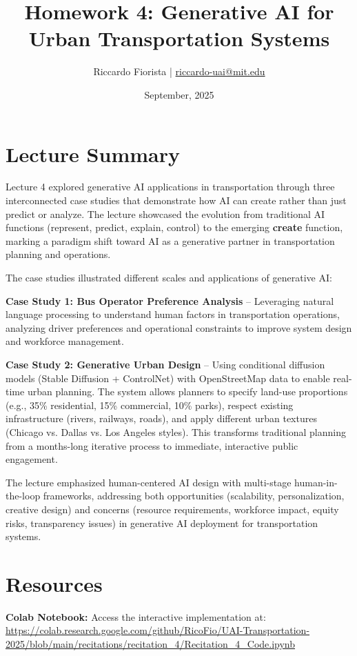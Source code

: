 \documentclass[11pt]{article}
\title{Homework 4: Generative AI for Urban Transportation Systems}
\author{Riccardo Fiorista | \href{mailto:riccardo-uai@mit.edu}{riccardo-uai@mit.edu}}
\date{September, 2025}
\begin{document}
\maketitle
\thispagestyle{fancy} %

\section*{Lecture Summary}

Lecture 4 explored generative AI applications in transportation through three interconnected case studies that demonstrate how AI can create rather than just predict or analyze. The lecture showcased the evolution from traditional AI functions (represent, predict, explain, control) to the emerging \textbf{create} function, marking a paradigm shift toward AI as a generative partner in transportation planning and operations.

The case studies illustrated different scales and applications of generative AI:

\textbf{Case Study 1: Bus Operator Preference Analysis} -- Leveraging natural language processing to understand human factors in transportation operations, analyzing driver preferences and operational constraints to improve system design and workforce management.

\textbf{Case Study 2: Generative Urban Design} -- Using conditional diffusion models (Stable Diffusion + ControlNet) with OpenStreetMap data to enable real-time urban planning. The system allows planners to specify land-use proportions (e.g., 35\% residential, 15\% commercial, 10\% parks), respect existing infrastructure (rivers, railways, roads), and apply different urban textures (Chicago vs. Dallas vs. Los Angeles styles). This transforms traditional planning from a months-long iterative process to immediate, interactive public engagement.

The lecture emphasized human-centered AI design with multi-stage human-in-the-loop frameworks, addressing both opportunities (scalability, personalization, creative design) and concerns (resource requirements, workforce impact, equity risks, transparency issues) in generative AI deployment for transportation systems.

\section*{Resources}

\textbf{Colab Notebook:} Access the interactive implementation at:\\
\url{https://colab.research.google.com/github/RicoFio/UAI-Transportation-2025/blob/main/recitations/recitation_4/Recitation_4_Code.ipynb}
\end{document}
